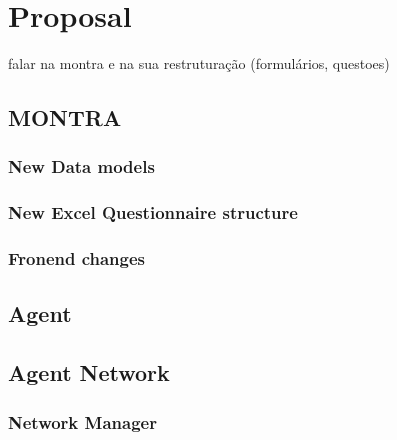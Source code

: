\chapter{Proposal}
\label{chapter:proposal}

falar na montra e na sua restruturação (formulários, questoes)


\section{MONTRA}
\subsection{New Data models}


\subsection{New Excel Questionnaire structure}

\subsection{Fronend changes}
%

\section{Agent}

\section{Agent Network}

\subsection{Network Manager}
